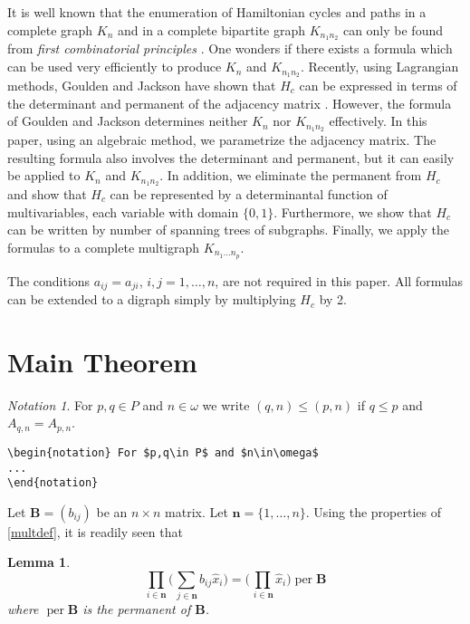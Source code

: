 \documentclass{article}
\newtheorem{lem}[thm]{Lemma}
\theoremstyle{definition}
\theoremstyle{remark}
\newtheorem*{notation}{Notation}
\DeclareMathOperator{\per}{per}
\begin{document}
It is well known that the enumeration of Hamiltonian cycles and paths in
a complete graph $K_n$ and in a complete bipartite graph $K_{n_1n_2}$
can only be found from \textit{first combinatorial principles}
\cite{hapa:graphenum}. One wonders if there exists a formula which can
be used very efficiently to produce $K_n$ and $K_{n_1n_2}$. Recently,
using Lagrangian methods, Goulden and Jackson have shown that $H_c$ can
be expressed in terms of the determinant and permanent of the adjacency
matrix \cite{gouja:lagrmeth}. However, the formula of Goulden and
Jackson determines neither $K_n$ nor $K_{n_1n_2}$ effectively. In this
paper, using an algebraic method, we parametrize the adjacency matrix.
The resulting formula also involves the determinant and permanent, but
it can easily be applied to $K_n$ and $K_{n_1n_2}$. In addition, we
eliminate the permanent from $H_c$ and show that $H_c$ can be
represented by a determinantal function of multivariables, each variable
with domain $\{0,1\}$. Furthermore, we show that $H_c$ can be written by
number of spanning trees of subgraphs. Finally, we apply the formulas to
a complete multigraph $K_{n_1\dots n_p}$.

The conditions $a_{ij}=a_{ji}$, $i,j=1,\dots,n$, are not required in
this paper. All formulas can be extended to a digraph simply by
multiplying $H_c$ by 2.

\section{Main Theorem}
\label{s:mt}

\begin{notation} For $p,q\in P$ and $n\in\omega$ we write
$(q,n)\le(p,n)$ if $q\le p$ and $A_{q,n}=A_{p,n}$.
\begin{verbatim}
\begin{notation} For $p,q\in P$ and $n\in\omega$
...
\end{notation}
\end{verbatim}
\end{notation}

Let $\mathbf{B}=(b_{ij})$ be an $n\times n$ matrix. Let $\mathbf{n}=\{1,
\dots,n\}$. Using the properties of \eqref{multdef}, it is readily seen
that

\begin{lem}\label{lem-per}
\begin{equation}
\prod_{i\in\mathbf{n}}
\biggl(\sum_{\,j\in\mathbf{n}}b_{ij}\hat x_i\biggr)
=\biggl(\prod_{\,i\in\mathbf{n}}\hat x_i\biggr)\per \mathbf{B}
\end{equation}
where $\per \mathbf{B}$ is the permanent of $\mathbf{B}$.
\end{lem}
\end{document}
